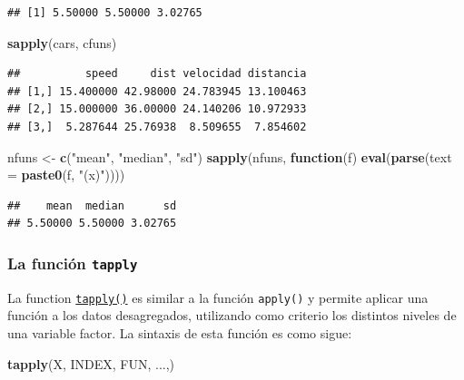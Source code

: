 \documentclass[]{book}
\newenvironment{Shaded}{\begin{snugshade}}{\end{snugshade}}
\newcommand{\ControlFlowTok}[1]{\textcolor[rgb]{0.13,0.29,0.53}{\textbf{#1}}}
\newcommand{\DataTypeTok}[1]{\textcolor[rgb]{0.13,0.29,0.53}{#1}}
\newcommand{\KeywordTok}[1]{\textcolor[rgb]{0.13,0.29,0.53}{\textbf{#1}}}
\newcommand{\NormalTok}[1]{#1}
\newcommand{\StringTok}[1]{\textcolor[rgb]{0.31,0.60,0.02}{#1}}
\begin{document}
\begin{verbatim}
## [1] 5.50000 5.50000 3.02765
\end{verbatim}

\begin{Shaded}
\begin{Highlighting}[]
\KeywordTok{sapply}\NormalTok{(cars, cfuns)}
\end{Highlighting}
\end{Shaded}

\begin{verbatim}
##          speed     dist velocidad distancia
## [1,] 15.400000 42.98000 24.783945 13.100463
## [2,] 15.000000 36.00000 24.140206 10.972933
## [3,]  5.287644 25.76938  8.509655  7.854602
\end{verbatim}

\begin{Shaded}
\begin{Highlighting}[]
\NormalTok{nfuns <-}\StringTok{ }\KeywordTok{c}\NormalTok{(}\StringTok{"mean"}\NormalTok{, }\StringTok{"median"}\NormalTok{, }\StringTok{"sd"}\NormalTok{)}
\KeywordTok{sapply}\NormalTok{(nfuns, }\ControlFlowTok{function}\NormalTok{(f) }\KeywordTok{eval}\NormalTok{(}\KeywordTok{parse}\NormalTok{(}\DataTypeTok{text =} \KeywordTok{paste0}\NormalTok{(f, }\StringTok{"(x)"}\NormalTok{))))}
\end{Highlighting}
\end{Shaded}

\begin{verbatim}
##    mean  median      sd 
## 5.50000 5.50000 3.02765
\end{verbatim}

\hypertarget{la-funcion-tapply}{%
\subsubsection{\texorpdfstring{La función \texttt{tapply}}{La función tapply}}\label{la-funcion-tapply}}

La function \href{https://www.rdocumentation.org/packages/base/versions/3.6.1/topics/tapply}{\texttt{tapply()}} es
similar a la función \texttt{apply()} y permite aplicar una función a los datos desagregados,
utilizando como criterio los distintos niveles de una variable factor.
La sintaxis de esta función es como sigue:

\begin{Shaded}
\begin{Highlighting}[]
    \KeywordTok{tapply}\NormalTok{(X, INDEX, FUN, ...,)}
\end{Highlighting}
\end{Shaded}
\end{document}
